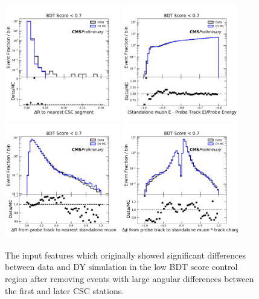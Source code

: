 \begin{figure}[htbp]
	\label{fig:lowScoreInputCorrection}
	\centering
	\includegraphics[width=0.45\textwidth]{figures/partialRegioncscDR.pdf}
	\hspace{0.01\textwidth}
	\includegraphics[width=0.45\textwidth]{figures/partialRegionstandaloneDEoverE.pdf}
	\vspace{0.01\textwidth}
	\includegraphics[width=0.45\textwidth]{figures/partialRegionstaDR.pdf}
	\hspace{0.01\textwidth}
	\includegraphics[width=0.45\textwidth]{figures/partialRegionstaPhi.pdf} 
        \caption[Low-Score Event Validation After Correction]{The input features which originally showed significant differences between data and DY simulation in the low BDT score control region after removing events with large angular differences between the first and later CSC stations.}
\end{figure}

